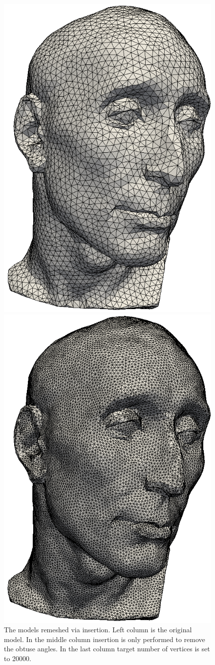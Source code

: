 \documentclass[letter,11pt]{article}
\begin{document}
\begin{figure}
\begin{minipage}{.30\textwidth}
  \end{minipage} 
  \begin{minipage}{0.30\textwidth}
    \centering
    \includegraphics[width=0.7\linewidth]{../image/nicolo_b.png}
  \end{minipage}
  \begin{minipage}{.30\textwidth}
    \centering
    \includegraphics[width=0.7\linewidth]{../image/nicolo_c.png}
  \end{minipage}
  \caption{The models remeshed via insertion. Left column is the
    original model. In the middle column insertion is only performed
    to remove the obtuse angles. In the last column target number of
    vertices is set to 20000.}
  \label{fig:ins_meshes}
\end{figure}
\end{document}
